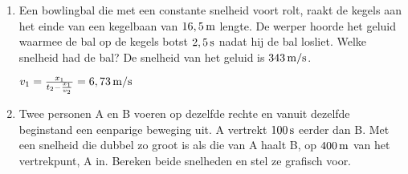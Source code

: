 \begin{enumerate}
\item Een bowlingbal die met een constante snelheid voort rolt, raakt de kegels aan het einde van een kegelbaan van $16,5\rm\,m$ lengte. De werper hoorde het geluid waarmee de bal op de kegels botst $2,5\rm\,s$ nadat hij de bal losliet. Welke snelheid had de bal? De snelheid van het geluid is $343\rm\,m/s$. 
\begin{oplossing}
$v_1=\frac{x_1}{t_2-\frac{x_1}{v_2}}=6,73\rm\,m/s$
\end{oplossing}

\item Twee personen A en B voeren op dezelfde rechte en vanuit dezelfde beginstand een eenparige beweging uit. A vertrekt $100\rm\,s$ eerder dan B. Met een snelheid die dubbel zo groot is als die van A haalt B, op $400\rm\,m$ van het vertrekpunt, A in. Bereken beide snelheden en stel ze grafisch voor.



\end{enumerate}
